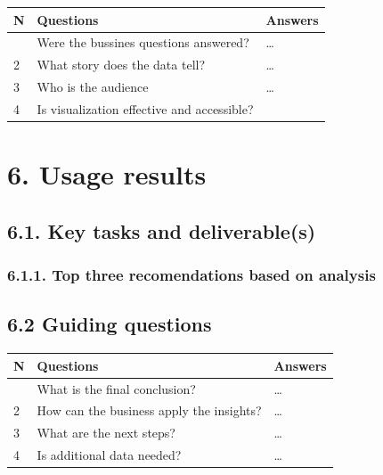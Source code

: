 \documentclass[
]{article}
\begin{document}
\begin{longtable}[]{@{}lll@{}}
\toprule\noalign{}
N & Questions & Answers \\
\midrule\noalign{}
\endhead
\bottomrule\noalign{}
\endlastfoot
1 & Were the bussines questions answered? & \ldots{} \\
2 & What story does the data tell? & \ldots{} \\
3 & Who is the audience & \ldots{} \\
4 & Is visualization effective and accessible? & \\
\end{longtable}

\newpage

\section{\texorpdfstring{\textbf{6. Usage
results}}{6. Usage results}}\label{usage-results}

\subsection{\texorpdfstring{\textbf{6.1. Key tasks and
deliverable(s)}}{6.1. Key tasks and deliverable(s)}}\label{key-tasks-and-deliverables-3}

\subsubsection{\texorpdfstring{\textbf{6.1.1. Top three recomendations
based on
analysis}}{6.1.1. Top three recomendations based on analysis}}\label{top-three-recomendations-based-on-analysis}

\subsection{\texorpdfstring{\textbf{6.2 Guiding
questions}}{6.2 Guiding questions}}\label{guiding-questions-4}

\begin{longtable}[]{@{}lll@{}}
\toprule\noalign{}
N & Questions & Answers \\
\midrule\noalign{}
\endhead
\bottomrule\noalign{}
\endlastfoot
1 & What is the final conclusion? & \ldots{} \\
2 & How can the business apply the insights? & \ldots{} \\
3 & What are the next steps? & \ldots{} \\
4 & Is additional data needed? & \ldots{} \\
\end{longtable}
\end{document}
